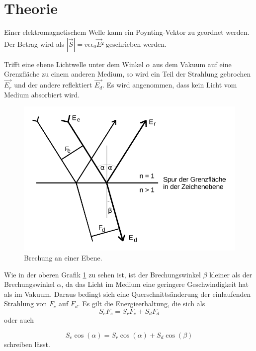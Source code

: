 \section{Theorie}
\label{sec:Theorie}

Einer elektromagnetischem Welle kann ein Poynting-Vektor zu geordnet werden. Der Betrag wird als $ \left| \vec{S}\right|  = v \epsilon \epsilon_0  \vec{E}²$  geschrieben werden.

Trifft eine ebene Lichtwelle unter dem Winkel  $\alpha$  aus dem Vakuum auf eine Grenzfläche zu einem anderen Medium, so wird ein Teil der Strahlung gebrochen $\vec{E_r}$ und der andere reflektiert $\vec{E_d}$. Es wird angenommen, dass kein Licht vom Medium absorbiert wird.


\begin{figure}
    \centering
    \includegraphics{Brechung an einer Ebene.pdf}
    \caption{Brechung an einer Ebene.} 
    \label{fig:abb1}
\end{figure}

Wie in der oberen Grafik \ref{fig:abb1} zu sehen ist, ist der Brechungswinkel $ \beta$ kleiner als der Brechungswinkel $\alpha$, da das Licht im Medium eine geringere Geschwindigkeit hat als im Vakuum.
Daraus bedingt sich eine Querschnittsänderung der einlaufenden Strahlung von $F_e$ auf $F_d$. 
Es gilt die Energieerhaltung, die sich als
\begin{equation}
    S_e F_e = S_r F_e +  S_d F_d
    \label{eq:Energieerhaltung}
\end{equation}
oder auch 

\begin{equation}
    S_e \cos(\alpha) = S_r \cos(\alpha) +  S_d \cos(\beta)
    \label{eq:Energieerhaltung}
\end{equation}
schreiben lässt.